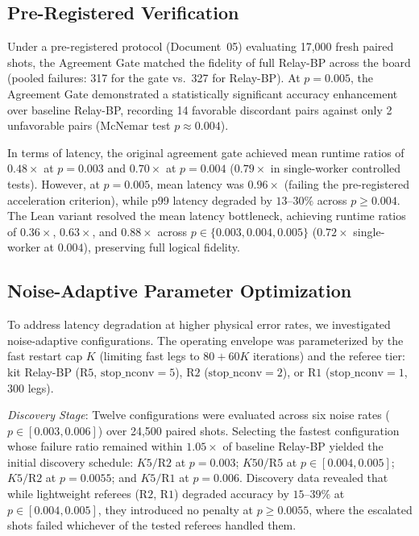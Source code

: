 \subsection{Pre-Registered Verification}

Under a pre-registered protocol (Document~05) evaluating 17,000 fresh paired shots, the Agreement Gate matched the fidelity of full Relay-BP across the board (pooled failures: 317 for the gate vs.\ 327 for Relay-BP). At $p = 0.005$, the Agreement Gate demonstrated a statistically significant accuracy enhancement over baseline Relay-BP, recording 14 favorable discordant pairs against only 2 unfavorable pairs (McNemar test $p \approx 0.004$).

In terms of latency, the original agreement gate achieved mean runtime ratios of $0.48\times$ at $p = 0.003$ and $0.70\times$ at $p = 0.004$ ($0.79\times$ in single-worker controlled tests). However, at $p = 0.005$, mean latency was $0.96\times$ (failing the pre-registered acceleration criterion), while p99 latency degraded by $13\text{--}30\%$ across $p \ge 0.004$. The Lean variant resolved the mean latency bottleneck, achieving runtime ratios of $0.36\times$, $0.63\times$, and $0.88\times$ across $p \in \{0.003, 0.004, 0.005\}$ ($0.72\times$ single-worker at $0.004$), preserving full logical fidelity.

\subsection{Noise-Adaptive Parameter Optimization}

To address latency degradation at higher physical error rates, we investigated noise-adaptive configurations. The operating envelope was parameterized by the fast restart cap $K$ (limiting fast legs to $80 + 60K$ iterations) and the referee tier: kit Relay-BP ($\text{R5}$, $\text{stop\_nconv} = 5$), $\text{R2}$ ($\text{stop\_nconv} = 2$), or $\text{R1}$ ($\text{stop\_nconv} = 1$, 300 legs).

\textit{Discovery Stage}: Twelve configurations were evaluated across six noise rates ($p \in [0.003, 0.006]$) over 24,500 paired shots. Selecting the fastest configuration whose failure ratio remained within $1.05\times$ of baseline Relay-BP yielded the initial discovery schedule: $K5/\text{R2}$ at $p = 0.003$; $K50/\text{R5}$ at $p \in [0.004, 0.005]$; $K5/\text{R2}$ at $p = 0.0055$; and $K5/\text{R1}$ at $p = 0.006$. Discovery data revealed that while lightweight referees ($\text{R2}$, $\text{R1}$) degraded accuracy by $15\text{--}39\%$ at $p \in [0.004, 0.005]$, they introduced no penalty at $p \ge 0.0055$, where the escalated shots failed whichever of the tested referees handled them.

